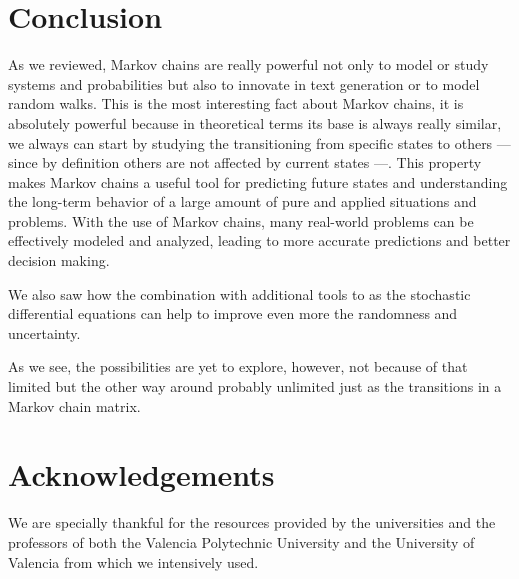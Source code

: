 \documentclass[12pt]{article}
\numberwithin{equation}{section}
\begin{document}
\section{Conclusion}

As we reviewed, Markov chains are really powerful not only to model or study systems and probabilities but also to innovate in text generation or to model random walks. This is the most interesting fact about Markov chains, it is absolutely powerful because in theoretical terms its base is always really similar, we always can  start by studying the transitioning from specific states to others --- since by definition others are not affected by current states ---. This property makes Markov chains a useful tool for predicting future states and understanding the long-term behavior of a large amount of pure and applied situations and problems. With the use of Markov chains, many real-world problems can be effectively modeled and analyzed, leading to more accurate predictions and better decision making.

We also saw how the combination with additional tools to as the stochastic differential equations can help to improve even more the randomness and uncertainty. 

As we see, the possibilities are yet to explore, however, not because of that limited but the other way around probably unlimited just as the transitions in a Markov chain matrix. 

\section{Acknowledgements}

We are specially thankful for the resources provided by 
the universities and the professors of both the Valencia Polytechnic University and the University of Valencia from which we intensively used. 
 













\end{document}
